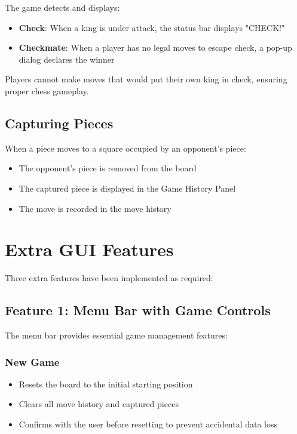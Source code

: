 \documentclass[12pt]{article}
\begin{document}
The game detects and displays:
\begin{itemize}
    \item \textbf{Check}: When a king is under attack, the status bar displays "CHECK!"
    \item \textbf{Checkmate}: When a player has no legal moves to escape check, a pop-up dialog declares the winner
\end{itemize}

Players cannot make moves that would put their own king in check, ensuring proper chess gameplay.

\subsection{Capturing Pieces}

When a piece moves to a square occupied by an opponent's piece:
\begin{itemize}
    \item The opponent's piece is removed from the board
    \item The captured piece is displayed in the Game History Panel
    \item The move is recorded in the move history
\end{itemize}

\section{Extra GUI Features}

Three extra features have been implemented as required:

\subsection{Feature 1: Menu Bar with Game Controls}

The menu bar provides essential game management features:

\subsubsection{New Game}
\begin{itemize}
    \item Resets the board to the initial starting position
    \item Clears all move history and captured pieces
    \item Confirms with the user before resetting to prevent accidental data loss
\end{itemize}
\end{document}
